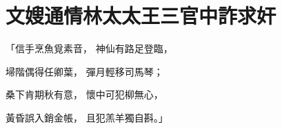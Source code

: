 %

\chapter{文嫂通情林太太\KG 王三官中詐求奸}


\begin{showcontents}{}




「信手烹魚覓素音，  神仙有路足登臨，

埽階偶得任卿葉，  彈月輕移司馬琴；

桑下肯期秋有意，  懷中可犯柳無心，

黃昏誤入銷金帳，  且犯羔羊獨自斟。」


\end{showcontents}
